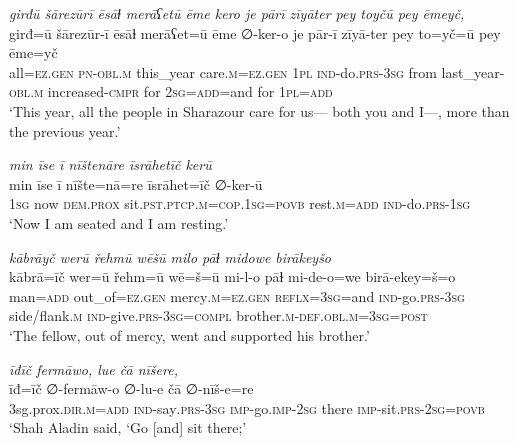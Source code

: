 \ea \label{PM.38}
\textit{girđū šārezūrī ēsāɫ merāʕetū ēme kero je pārī zīyāter pey toyčū pey ēmeyč,} \\ 
\gll girđ=ū šārezūr-ī ēsāɫ merāʕet=ū ēme ∅-ker-o je pār-ī zīyā-ter pey to=yč=ū pey ēme=yč \\ 
 all\textsc{\textsc{=ez.gen}} \textsc{pn}\textsc{-obl}\textsc{.m} this\_year care\textsc{.m}\textsc{\textsc{=ez.gen}} \textsc{1pl} \textsc{ind-}do\textsc{.prs}\textsc{-3sg} from last\_year\textsc{-obl}\textsc{.m} increased\textsc{-cmpr} for \textsc{2sg}\textsc{=add}=and for \textsc{1pl}\textsc{=add} \\ 
\glt `This year, all the people in Sharazour care for us— both you and I—, more than the previous year.'
\z 
 
\ea \label{PM.45}
\textit{min īse ī nīštenāre īsrāhetīč kerū} \\ 
\gll min īse ī nīšte=nā=re īsrāhet=īč ∅-ker-ū \\ 
 \textsc{1sg} now \textsc{dem.prox} sit\textsc{.pst}\textsc{.ptcp}\textsc{.m}\textsc{=cop}\textsc{.\textsc{1sg}}\textsc{=\textsc{povb}} rest\textsc{.m}\textsc{=add} \textsc{ind-}do\textsc{.prs}\textsc{-\textsc{1sg}} \\ 
\glt `Now I am seated and I am resting.'
\z 
 
\ea \label{DG.16}
\textit{kābrāyč werū řehmū wēšū milo pāɫ midowe birākeyšo} \\ 
\gll kābrā=īč wer=ū řehm=ū wē=š=ū mi-l-o pāɫ mi-de-o=we birā-ekey=š=o \\ 
 man\textsc{=add} out\_of\textsc{=ez}\textsc{.gen} mercy\textsc{.m}\textsc{=ez}\textsc{.gen} \textsc{reflx}\textsc{=3sg}=and \textsc{ind-}go\textsc{.prs}\textsc{-3sg} side/flank\textsc{.m} \textsc{ind-}give\textsc{.prs}\textsc{-3sg}\textsc{=\textsc{compl}} brother\textsc{.m}\textsc{-def}\textsc{.obl}\textsc{.m}\textsc{=3sg}\textsc{=\textsc{post}} \\ 
\glt `The fellow, out of mercy, went and supported his brother.'
\z 
 
\ea \label{DG.44}
\textit{īđīč fermāwo, lue čā nīšere,} \\ 
\gll īđ=īč ∅-fermāw-o ∅-lu-e čā ∅-nīš-e=re \\ 
 3sg.prox\textsc{.dir}\textsc{.m}\textsc{=add} \textsc{ind-}say\textsc{.prs}\textsc{-3sg} \textsc{imp-}go.\textsc{imp-}\textsc{2sg} there \textsc{imp-}sit\textsc{.prs}-\textsc{2sg}\textsc{=\textsc{povb}} \\ 
\glt `Shah Aladin  said, ‘Go [and] sit there;'
\z 
 
